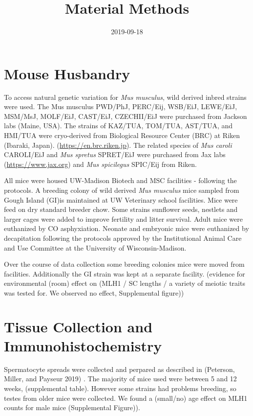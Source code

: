 \documentclass[]{article}
\title{Material Methods}
\author{}
\date{2019-09-18}
\begin{document}
\maketitle

{
\setcounter{tocdepth}{5}
\tableofcontents
}
\section{Mouse Husbandry}\label{mouse-husbandry}

To access natural genetic variation for \emph{Mus musculus}, wild
derived inbred strains were used. The Mus musculus PWD/PhJ, PERC/Eij,
WSB/EiJ, LEWE/EiJ, MSM/MsJ, MOLF/EiJ, CAST/EiJ, CZECHII/EiJ were
purchased from Jackson labs (Maine, USA). The strains of KAZ/TUA,
TOM/TUA, AST/TUA, and HMI/TUA were cryo-derived from Biological Resource
Center (BRC) at Riken (Ibaraki, Japan). (\url{https://en.brc.riken.jp}).
The related species of \emph{Mus caroli} CAROLI/EiJ and \emph{Mus
spretus} SPRET/EiJ were purchased from Jax labs
(\url{https://www.jax.org}) and \emph{Mus spicilegus} SPIC/Eij from
Riken.

All mice were housed UW-Madison Biotech and MSC facilities - following
the protocols. A breeding colony of wild derived \emph{Mus musculus}
mice sampled from Gough Island (GI)is maintained at UW Veterinary school
facilities. Mice were feed on dry standard breeder chow. Some strains
sunflower seeds, nestlets and larger cages were added to improve
fertility and litter survival. Adult mice were euthanized by CO
asphyxiation. Neonate and embryonic mice were euthanized by decapitation
following the protocols approved by the Institutional Animal Care and
Use Committee at the University of Wisconsin-Madison.

Over the course of data collection some breeding colonies mice were
moved from facilities. Additionally the GI strain was kept at a separate
facility. (evidence for environmental (room) effect on (MLH1 / SC
lengths / a variety of meiotic traits was tested for. We observed no
effect, Supplemental figure))

\section{Tissue Collection and
Immunohistochemistry}\label{tissue-collection-and-immunohistochemistry}

Spermatocyte spreads were collected and perpared as described in
(Peterson, Miller, and Payseur 2019) . The majority of mice used were
between 5 and 12 weeks, (supplemental table). However some strains had
problems breeding, so testes from older mice were collected. We found a
(small/no) age effect on MLH1 counts for male mice (Supplemental
Figure)).
\end{document}
